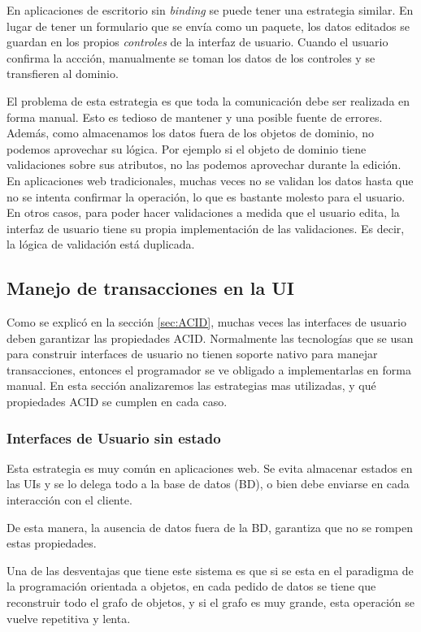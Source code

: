 	En aplicaciones de escritorio sin \emph{binding} se puede tener una estrategia
	similar. En lugar de tener un formulario que se envía como un paquete, los
	datos editados se guardan en los propios \emph{controles} de la interfaz de
	usuario. Cuando el usuario confirma la accción, manualmente se toman los datos
	de los controles y se transfieren al dominio.

	\medskip
	
	El problema de esta estrategia es que toda la comunicación debe ser realizada
	en forma manual. Esto es tedioso de mantener y una posible fuente de errores.
	Además, como almacenamos los datos fuera de los objetos de dominio, no podemos
	aprovechar su lógica. Por ejemplo si el objeto de dominio tiene validaciones
	sobre sus atributos, no las podemos aprovechar durante la edición. En
	aplicaciones web tradicionales, muchas veces no se validan los datos hasta que
	no se intenta confirmar la operación, lo que es bastante molesto para el
	usuario. En otros casos, para poder hacer validaciones a medida que el usuario
	edita, la interfaz de usuario tiene su propia implementación de las validaciones. 
	Es decir, la lógica de validación está duplicada.
	 		
\subsection{Manejo de transacciones en la UI}
	Como se explicó en la sección \ref{sec:ACID}, muchas veces las interfaces de
	usuario deben garantizar las propiedades ACID.
	Normalmente las tecnologías que se usan para construir interfaces de usuario no
	tienen soporte nativo para manejar transacciones, entonces el programador se ve
	obligado a implementarlas en forma manual.
	En esta sección analizaremos las estrategias mas utilizadas, y qué propiedades
	ACID se cumplen en cada caso.

	\subsubsection{Interfaces de Usuario sin estado}
		Esta estrategia es muy común en aplicaciones web. Se evita almacenar estados
		en las UIs y se lo delega todo a la base de datos (BD), o bien debe enviarse
		en cada interacción con el cliente.
		
		De esta manera, la	ausencia de datos fuera de la BD, garantiza que no se
		rompen estas propiedades.
		
		Una de las desventajas que tiene este sistema es que si se esta en el
		paradigma de la programación orientada a objetos, en cada pedido de datos
		se tiene que reconstruir todo el grafo de objetos, y si el grafo es muy grande,
		esta operación se vuelve repetitiva y lenta.
		
